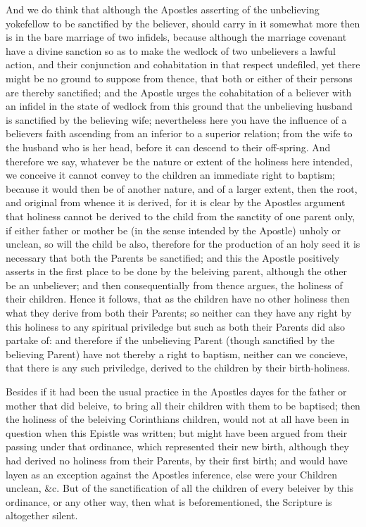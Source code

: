 \documentclass[12pt,a4paper]{book}
\begin{document}
And we do think that although the Apostles asserting of the unbelieving yokefellow to be sanctified by the believer, should carry in it somewhat more then is in the bare marriage of two infidels, because although the marriage covenant have a divine sanction so as to make the wedlock of two unbelievers a lawful action, and their conjunction and cohabitation in that respect undefiled, yet there might be no ground to suppose from thence, that both or either of their persons are thereby sanctified; and the Apostle urges the cohabitation of a believer with an infidel in the state of wedlock from this ground that the unbelieving husband is sanctified by the believing wife; nevertheless here you have the influence of a believers faith ascending from an inferior to a superior relation; from the wife to the husband who is her head, before it can descend to their off-spring. And therefore we say, whatever be the nature or extent of the holiness here intended, we conceive it cannot convey to the children an immediate right to baptism; because it would then be of another nature, and of a larger extent, then the root, and original from whence it is derived, for it is clear by the Apostles argument that holiness cannot be derived to the child from the sanctity of one parent only, if either father or mother be (in the sense intended by the Apostle) unholy or unclean, so will the child be also, therefore for the production of an holy seed it is necessary that both the Parents be sanctified; and this the Apostle positively asserts in the first place to be done by the beleiving parent, although the other be an unbeliever; and then consequentially from thence argues, the holiness of their children. Hence it follows, that as the children have no other holiness then what they derive from both their Parents; so neither can they have any right by this holiness to any spiritual priviledge but such as both their Parents did also partake of: and therefore if the unbelieving Parent (though sanctified by the believing Parent) have not thereby a right to baptism, neither can we concieve, that there is any such priviledge, derived to the children by their birth-holiness.

Besides if it had been the usual practice in the Apostles dayes for the father or mother that did beleive, to bring all their children with them to be baptised; then the holiness of the beleiving Corinthians children, would not at all have been in question when this Epistle was written; but might have been argued from their passing under that ordinance, which represented their new birth, although they had derived no holiness from their Parents, by their first birth; and would have layen as an exception against the Apostles inference, else were your Children unclean, &c. But of the sanctification of all the children of every beleiver by this ordinance, or any other way, then what is beforementioned, the Scripture is altogether silent.
\end{document}
